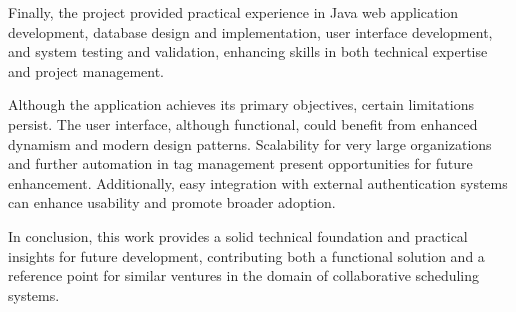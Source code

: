 Finally, the project provided practical experience in Java web application development, database design and implementation, user interface development, and system testing and validation, enhancing skills in both technical expertise and project management.

Although the application achieves its primary objectives, certain limitations persist.
The user interface, although functional, could benefit from enhanced dynamism and modern design patterns.
Scalability for very large organizations and further automation in tag management present opportunities for future enhancement.
Additionally, easy integration with external authentication systems can enhance usability and promote broader adoption.

In conclusion, this work provides a solid technical foundation and practical insights for future development, contributing both a functional solution and a reference point for similar ventures in the domain of collaborative scheduling systems.